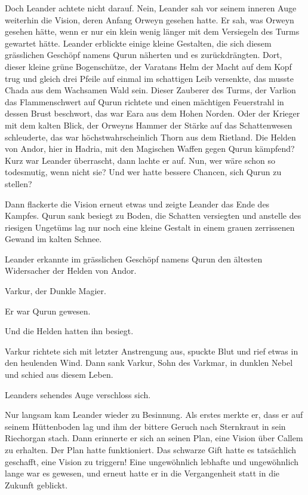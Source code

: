 \documentclass[10pt, a4paper, oneside]{book}
\begin{document}
Doch Leander achtete nicht darauf. Nein, Leander sah vor seinem inneren Auge weiterhin die Vision, deren Anfang Orweyn gesehen hatte. Er sah, was Orweyn gesehen hätte, wenn er nur ein klein wenig länger mit dem Versiegeln des Turms gewartet hätte. Leander erblickte einige kleine Gestalten, die sich diesem grässlichen Geschöpf namens Qurun näherten und es zurückdrängten. Dort, dieser kleine grüne Bogenschütze, der Varatans Helm der Macht auf dem Kopf trug und gleich drei Pfeile auf einmal im schattigen Leib versenkte, das musste Chada aus dem Wachsamen Wald sein. Dieser Zauberer des Turms, der Varlion das Flammenschwert auf Qurun richtete und einen mächtigen Feuerstrahl in dessen Brust beschwort, das war Eara aus dem Hohen Norden. Oder der Krieger mit dem kalten Blick, der Orweyns Hammer der Stärke auf das Schattenwesen schleuderte, das war höchstwahrscheinlich Thorn aus dem Rietland. Die Helden von Andor, hier in Hadria, mit den Magischen Waffen gegen Qurun kämpfend? Kurz war Leander überrascht, dann lachte er auf. Nun, wer wäre schon so todesmutig, wenn nicht sie? Und wer hatte bessere Chancen, sich Qurun zu stellen?

Dann flackerte die Vision erneut etwas und zeigte Leander das Ende des Kampfes. Qurun sank besiegt zu Boden, die Schatten versiegten und anstelle des riesigen Ungetüms lag nur noch eine kleine Gestalt in einem grauen zerrissenen Gewand im kalten Schnee.

Leander erkannte im grässlichen Geschöpf namens Qurun den ältesten Widersacher der Helden von Andor.

Varkur, der Dunkle Magier.

Er war Qurun gewesen.

Und die Helden hatten ihn besiegt.

Varkur richtete sich mit letzter Anstrengung aus, spuckte Blut und rief etwas in den heulenden Wind. Dann sank Varkur, Sohn des Varkmar, in dunklen Nebel und schied aus diesem Leben.

Leanders sehendes Auge verschloss sich.\bigskip







Nur langsam kam Leander wieder zu Besinnung. Als erstes merkte er, dass er auf seinem Hüttenboden lag und ihm der bittere Geruch nach Sternkraut in sein Riechorgan stach. Dann erinnerte er sich an seinen Plan, eine Vision über Callem zu erhalten. Der Plan hatte funktioniert. Das schwarze Gift hatte es tatsächlich geschafft, eine Vision zu triggern! Eine ungewöhnlich lebhafte und ungewöhnlich lange war es gewesen, und erneut hatte er in die Vergangenheit statt in die Zukunft geblickt.
\end{document}
